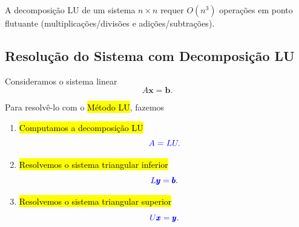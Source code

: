 \begin{obs}
  A decomposição LU de um sistema $n\times n$ requer $O(n^3)$ operações em ponto flutuante (multiplicações/divisões e adições/subtrações).
\end{obs}


\subsection{Resolução do Sistema com Decomposição LU}

Consideramos o sistema linear
\begin{equation}
  A\pmb{x} = \pmb{b}.
\end{equation}

Para resolvê-lo com o \hl{Método LU}, fazemos
\begin{enumerate}[1.]
\item \hl{Computamos a decomposição LU}
  \begin{equation}\color{blue}A = LU.
  \end{equation}
\item \hl{Resolvemos o sistema triangular inferior}
  \begin{equation}\color{blue}L\pmb{y} = \pmb{b}.
  \end{equation}
\item \hl{Resolvemos o sistema triangular superior}
  \begin{equation}\color{blue}U\pmb{x} = \pmb{y}.
  \end{equation}
\end{enumerate}

